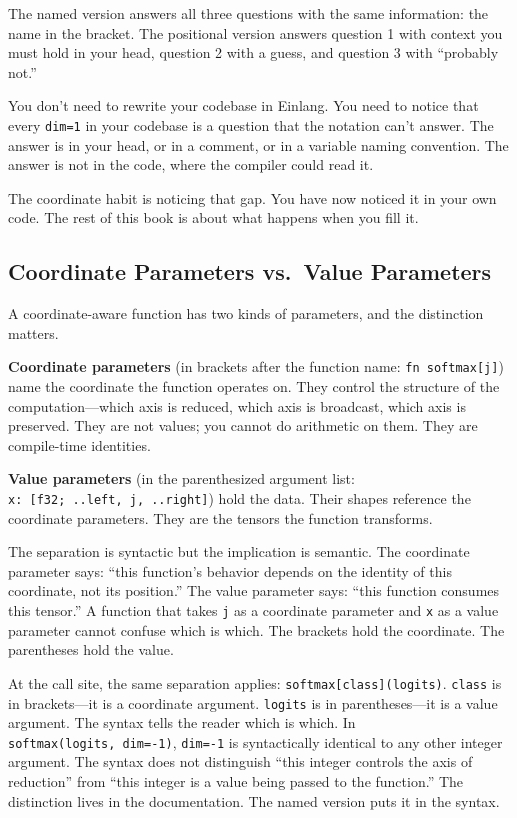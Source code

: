 \documentclass[11pt,titlepage]{article}
\begin{document}
The named version answers all three questions with the same information:
the name in the bracket. The positional version answers question 1 with
context you must hold in your head, question 2 with a guess, and
question 3 with ``probably not.''

You don't need to rewrite your codebase in Einlang. You need to notice
that every \texttt{dim=1} in your codebase is a question that the
notation can't answer. The answer is in your head, or in a comment, or
in a variable naming convention. The answer is not in the code, where
the compiler could read it.

The coordinate habit is noticing that gap. You have now noticed it in
your own code. The rest of this book is about what happens when you fill
it.

\vspace{2em}

\hypertarget{coordinate-parameters-vs.value-parameters}{%
\subsection{Coordinate Parameters vs.~Value
Parameters}\label{coordinate-parameters-vs.value-parameters}}

A coordinate-aware function has two kinds of parameters, and the
distinction matters.

\textbf{Coordinate parameters} (in brackets after the function name:
\texttt{fn\ softmax{[}j{]}}) name the coordinate the function operates
on. They control the structure of the computation---which axis is
reduced, which axis is broadcast, which axis is preserved. They are not
values; you cannot do arithmetic on them. They are compile-time
identities.

\textbf{Value parameters} (in the parenthesized argument list:
\texttt{x:\ {[}f32;\ ..left,\ j,\ ..right{]}}) hold the data. Their
shapes reference the coordinate parameters. They are the tensors the
function transforms.

The separation is syntactic but the implication is semantic. The
coordinate parameter says: ``this function's behavior depends on the
identity of this coordinate, not its position.'' The value parameter
says: ``this function consumes this tensor.'' A function that takes
\texttt{j} as a coordinate parameter and \texttt{x} as a value parameter
cannot confuse which is which. The brackets hold the coordinate. The
parentheses hold the value.

At the call site, the same separation applies:
\texttt{softmax{[}class{]}(logits)}. \texttt{class} is in brackets---it
is a coordinate argument. \texttt{logits} is in parentheses---it is a
value argument. The syntax tells the reader which is which. In
\texttt{softmax(logits,\ dim=-1)}, \texttt{dim=-1} is syntactically
identical to any other integer argument. The syntax does not distinguish
``this integer controls the axis of reduction'' from ``this integer is a
value being passed to the function.'' The distinction lives in the
documentation. The named version puts it in the syntax.
\end{document}
